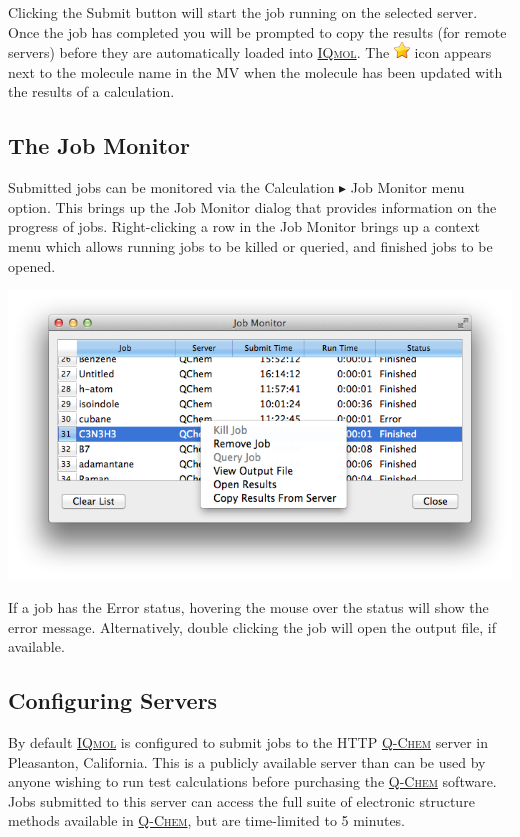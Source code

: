 \documentclass[a4paper,12pt]{article}
\newcommand{\qchem}{\href{http://q-chem.com}{{\scshape Q-Chem}}}
\newcommand{\iqmol}{\href{http://iqmol.org}{{\scshape IQmol}}}
\begin{document}
Clicking the Submit button will start the job running on the selected server.
Once the job has completed you will be prompted to copy the results (for remote
servers) before they are automatically loaded into \iqmol{}.  The
\includegraphics[scale=0.6]{figures/Favourites.png} icon appears next to the
molecule name in the MV when the molecule has been updated with the
results of a calculation.

\subsection{The Job Monitor}

Submitted jobs can be monitored via the Calculation $\blacktriangleright$ Job
Monitor menu option.  This brings up the Job Monitor dialog that provides
information on the progress of jobs.  Right-clicking a row in the Job
Monitor brings up a context menu which allows running jobs to be killed or
queried, and finished jobs to be opened.
\begin{center}
\includegraphics[scale=0.5]{figures/JobMonitor.png} \\
\end{center}
If a job has the Error status, hovering the mouse over the status will 
show the error message.  Alternatively, double clicking the job will open
the output file, if available.


\subsection{Configuring Servers}

By default \iqmol{} is configured to submit jobs to the HTTP \qchem{} server in
Pleasanton, California.  This is a publicly available server than can be used
by anyone wishing to run test calculations before purchasing the \qchem{}
software.  Jobs submitted to this server can access the full suite of
electronic structure methods available in \qchem{}, but are time-limited to 5
minutes. \\
\end{document}
